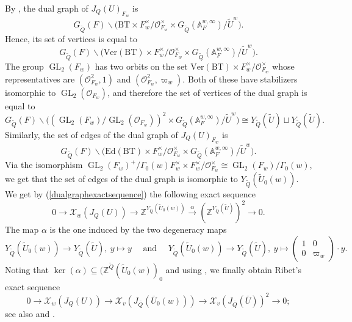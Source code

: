 \documentclass[a4paper, notitlepage, 10pt]{amsart}
\theoremstyle{plain} %
\theoremstyle{definition} %
\theoremstyle{remark} %
\numberwithin{equation}{section}
\newcommand{\GL}{\operatorname{GL}} %
\begin{document}
 By , the dual graph of $J_{Q}(U)_{F_{w}}$ is
\begin{equation*}
    G_{\widetilde{Q}}(F)\backslash\big(\text{BT}\times F_{w}^\times/\mathcal{O}_{F_{w}}^\times \times G_{\widetilde{Q}}(\mathbb{A}_F^{w,\infty})/\widetilde{U}^{w}\big).
\end{equation*}
Hence, its set of vertices is equal to
\begin{equation*}
    G_{\widetilde{Q}}(F)\backslash\big(\text{Ver}(\text{BT})\times F_{w}^\times/\mathcal{O}_{F_{w}}^\times \times G_{\widetilde{Q}}(\mathbb{A}_F^{w,\infty})/\widetilde{U}^{w}\big).
\end{equation*}
The group $\GL_2(F_{w})$ has two orbits on the set $\text{Ver}(\text{BT})\times F_{w}^\times/\mathcal{O}_{F_{w}}^\times$ whose representatives are $(\mathcal{O}_{F_{w}}^2,1)$ and $(\mathcal{O}_{F_{w}}^2,\varpi_{w})$. Both of these have stabilizers isomorphic to $\GL_2(\mathcal{O}_{F_{w}})$, and therefore the set of vertices of the dual graph is equal to
\begin{equation*}
     G_{\widetilde{Q}}(F)\backslash\big( (\GL_2(F_{w})/\GL_2(\mathcal{O}_{F_{w}}))^2 \times G_{\widetilde{Q}}(\mathbb{A}_F^{w,\infty})/\widetilde{U}^{w}\big)\cong Y_{\widetilde{Q}}(\widetilde{U})\sqcup Y_{\widetilde{Q}}(\widetilde{U}).
\end{equation*}
Similarly, the set of edges of the dual graph of $J_{Q}(U)_{F_{w}}$ is
\begin{equation*}
    G_{\widetilde{Q}}(F)\backslash\big(\text{Ed}(\text{BT})\times F_{w}^\times/\mathcal{O}_{F_{w}}^\times \times G_{\widetilde{Q}}(\mathbb{A}_F^{w,\infty})/\widetilde{U}^{w}\big).
\end{equation*}
Via the isomorphism  $\GL_2(F_{w})^+/\Gamma_0(w)F_{w}^\times \times F_{w}^\times/\mathcal{O}_{F_{w}}^\times\cong \GL_2(F_{w})/\Gamma_0(w)$, we get that the set of edges of the dual graph is isomorphic to $Y_{\widetilde{Q}}(\widetilde{U}_{0}(w))$. We get by (\ref{dualgraphexactsequence}) the following exact sequence
\begin{equation*}
    0 \rightarrow \mathcal{X}_{w}(J_{Q}(U))\rightarrow \mathbb{Z}^{Y_{\widetilde{Q}}(\widetilde{U}_0(w))}\xrightarrow{\alpha} (\mathbb{Z}^{Y_{\widetilde{Q}}(\widetilde{U})})^2 \rightarrow 0.
\end{equation*} 
The map $\alpha$ is the one induced by the two degeneracy maps $$Y_{\widetilde{Q}}(\widetilde{U}_0(w))\rightarrow Y_{\widetilde{Q}}(\widetilde{U}),\  y\mapsto y \quad \text{ and } \quad Y_{\widetilde{Q}}(\widetilde{U}_0(w))\rightarrow Y_{\widetilde{Q}}(\widetilde{U}),\  y\mapsto \begin{pmatrix}
    1 & 0 \\ 0 & \varpi_w
\end{pmatrix}\cdot y.$$
Noting that $\ker(\alpha)\subseteq (\mathbb{Z}^{\widetilde{Q}}(\widetilde{U}_0(w))_0$ and using , we finally obtain Ribet's exact sequence
\begin{equation}\label{ribetexseq}
    0 \rightarrow \mathcal{X}_{w}(J_Q(U))\rightarrow \mathcal{X}_{v}(J_{\overline{Q}}(\overline{U}_0(w)))\rightarrow \mathcal{X}_{v}(J_{\overline{Q}}(\overline{U}))^2 \rightarrow 0;
\end{equation}
 see also \cite[Proposition 2.7.6]{Dei14} and \cite[\S 3.2]{Raj01}.
\end{document}
